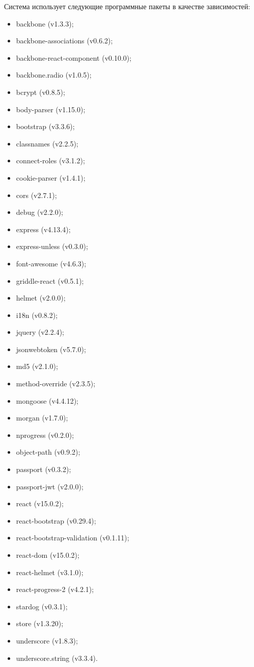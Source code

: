 \documentclass[a4paper]{G2-105}
\begin{document}
Система использует следующие программные пакеты в качестве зависимостей:
\begin{itemize}
\item backbone (v1.3.3);
\item backbone-associations (v0.6.2);
\item backbone-react-component (v0.10.0);
\item backbone.radio (v1.0.5);
\item bcrypt (v0.8.5);
\item body-parser (v1.15.0);
\item bootstrap (v3.3.6);
\item classnames (v2.2.5);
\item connect-roles (v3.1.2);
\item cookie-parser (v1.4.1);
\item cors (v2.7.1);
\item debug (v2.2.0);
\item express (v4.13.4);
\item express-unless (v0.3.0);
\item font-awesome (v4.6.3);
\item griddle-react (v0.5.1);
\item helmet (v2.0.0);
\item i18n (v0.8.2);
\item jquery (v2.2.4);
\item jsonwebtoken (v5.7.0);
\item md5 (v2.1.0);
\item method-override (v2.3.5);
\item mongoose (v4.4.12);
\item morgan (v1.7.0);
\item nprogress (v0.2.0);
\item object-path (v0.9.2);
\item passport (v0.3.2);
\item passport-jwt (v2.0.0);
\item react (v15.0.2);
\item react-bootstrap (v0.29.4);
\item react-bootstrap-validation (v0.1.11);
\item react-dom (v15.0.2);
\item react-helmet (v3.1.0);
\item react-progress-2 (v4.2.1);
\item stardog (v0.3.1);
\item store (v1.3.20);
\item underscore (v1.8.3);
\item underscore.string (v3.3.4).
\end{itemize}
\end{document}
